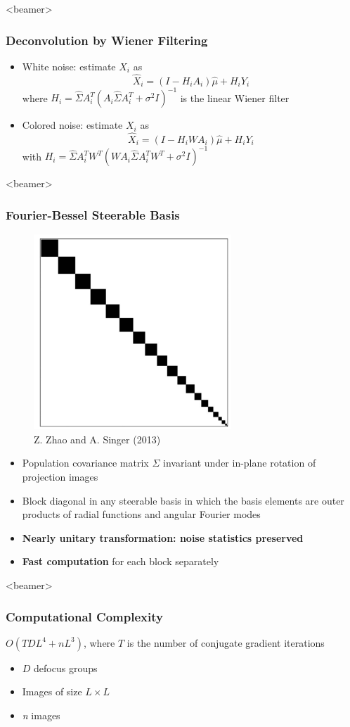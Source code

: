 \documentclass{beamer}
\begin{document}
\begin{frame}<beamer>
\frametitle{Deconvolution by Wiener Filtering}

\begin{itemize}
\item White noise: estimate $X_i$ as
\begin{equation*}
\hat X_i = (I-H_iA_{i})\hat\mu + H_iY_i 
\end{equation*}
where $H_i = \hat \Sigma A_{i}^T ( A_{i} \hat \Sigma A_{i}^T + \sigma^2 
I)^{-1} $ is the linear Wiener filter  
\item Colored noise: estimate $X_i$ as
\begin{equation*}
\hat X_i = (I-H_iWA_{i})\hat\mu + H_iY_i 
\end{equation*}
with $H_i = \hat \Sigma A_{i}^T W^T (W A_{i} \hat \Sigma A_{i}^T W^T 
+ \sigma^2 I)^{-1}$
\end{itemize}
\end{frame}


\begin{frame}<beamer>
\frametitle{Fourier-Bessel Steerable Basis }
\begin{figure}
\centering
\includegraphics[width=0.2\linewidth]{figures/blockcov.png}
\caption{Z. Zhao and A. Singer (2013)}
\end{figure}
\begin{itemize}[]
\item Population covariance matrix $\Sigma$ invariant under in-plane 
rotation of projection images
\item Block diagonal in any steerable basis in which the 
basis elements are outer products of radial functions and angular Fourier modes
\item \textbf{Nearly unitary transformation: noise statistics preserved}
\item \textbf{Fast computation} for each block separately
\end{itemize}
\end{frame}

\begin{frame}<beamer>
\frametitle{Computational Complexity}
$O(TDL^4 + nL^3)$, where $T$ is the number of conjugate gradient iterations
\begin{itemize}
\item $D$ defocus groups
\item Images of size $L \times L$
\item \textit{n} images
\end{itemize}
\end{frame}
\end{document}
